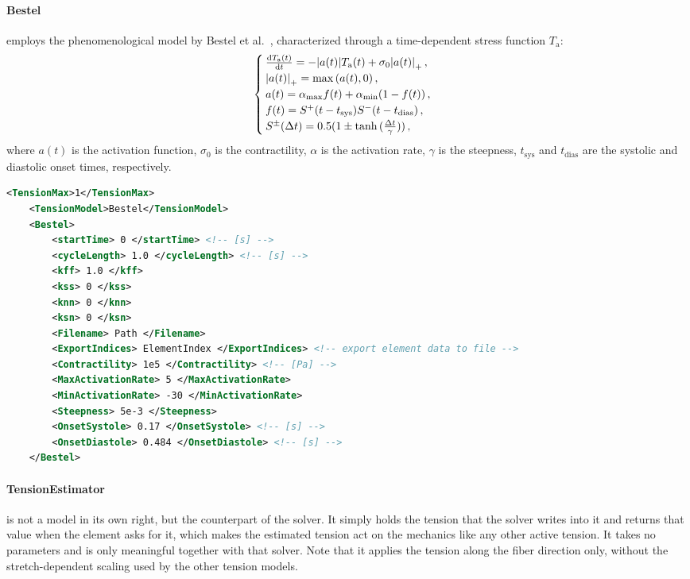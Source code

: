 \paragraph{Bestel} employs the phenomenological model by Bestel et al.~\cite{Bestel}, characterized through a time-dependent stress function $T_\mathrm{a}$:
\begin{equation}
    \begin{cases}
        \dv{T_\mathrm{a}(t)}{t} = -\abs{a(t)} T_\mathrm{a}(t) + \sigma_0 \abs{a(t)}_+ \,, \\
        \abs{a(t)}_+ = \max{(a(t),0)} \,, \\
        a(t) = \alpha_\mathrm{max} f(t) + \alpha_\mathrm{min} (1 - f(t)) \,, \\
        f(t) = S^+(t - t_\mathrm{sys}) S^-(t - t_\mathrm{dias}) \,, \\
        S^\pm(\Delta t) = 0.5 (1 \pm \tanh{(\frac{\Delta t}{\gamma})}) \,,
    \end{cases} \label{eq:Bestel}
\end{equation}
where $a(t)$ is the activation function, $\sigma_0$ is the contractility, $\alpha$ is the activation rate, $\gamma$ is the steepness, $t_\mathrm{sys}$ and $t_\mathrm{dias}$ are the systolic and diastolic onset times, respectively.

\begin{lstlisting}[language=XML,caption=.xml settings for the Bestel tension model]
    <TensionMax>1</TensionMax>
    <TensionModel>Bestel</TensionModel>
    <Bestel>
        <startTime> 0 </startTime> <!-- [s] -->
        <cycleLength> 1.0 </cycleLength> <!-- [s] -->
        <kff> 1.0 </kff>
        <kss> 0 </kss>
        <knn> 0 </knn>
        <ksn> 0 </ksn>
        <Filename> Path </Filename>
        <ExportIndices> ElementIndex </ExportIndices> <!-- export element data to file -->
        <Contractility> 1e5 </Contractility> <!-- [Pa] -->
        <MaxActivationRate> 5 </MaxActivationRate>
        <MinActivationRate> -30 </MinActivationRate>
        <Steepness> 5e-3 </Steepness>
        <OnsetSystole> 0.17 </OnsetSystole> <!-- [s] -->
        <OnsetDiastole> 0.484 </OnsetDiastole> <!-- [s] -->
    </Bestel>
\end{lstlisting}

\paragraph{TensionEstimator} \label{tension:TensionEstimator} is not a model in its own right, but the counterpart of the  solver.
It simply holds the tension that the solver writes into it and returns that value when the element asks for it, which makes the estimated tension act on the mechanics like any other active tension.
It takes no parameters and is only meaningful together with that solver.
Note that it applies the tension along the fiber direction only, without the stretch-dependent scaling used by the other tension models.

